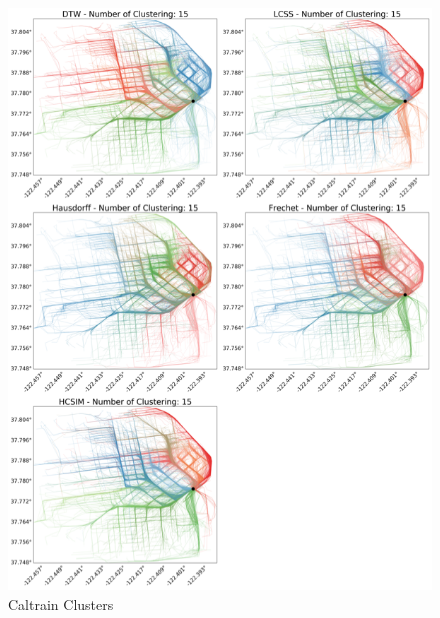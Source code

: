 \documentclass[a4paper, 12pt]{article}
\begin{document}
\begin{figure}[htbp!]
    \centering
    \includegraphics[width=1\textwidth]{Caltrain Plots.png}
    \caption{Caltrain Clusters}
    \label{fig35}
\end{figure}
\end{document}
